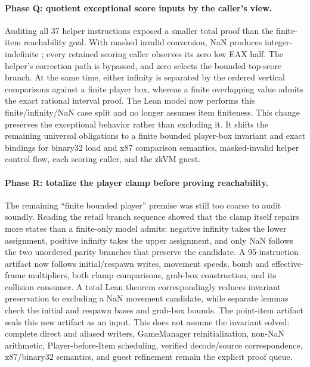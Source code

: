 \paragraph{Phase Q: quotient exceptional score inputs by the caller's view.}
Auditing all 37 helper instructions exposed a smaller total proof than the
finite-item reachability goal.  With masked invalid conversion, NaN produces
integer-indefinite ; every retained scoring caller
observes its zero low EAX half.  The helper's correction path is bypassed, and
zero selects the bounded top-score branch.  At the same time, either infinity
is separated by the ordered vertical comparisons against a finite player box,
whereas a finite overlapping value admits the exact rational interval proof.
The Lean model now performs this finite/infinity/NaN case split and no longer
assumes item finiteness.  This change preserves the exceptional behavior
rather than excluding it.  It shifts the remaining universal obligations to a
finite bounded player-box invariant and exact bindings for binary32 load and
x87 comparison semantics, masked-invalid helper control flow, each scoring
caller, and the zkVM guest.

\paragraph{Phase R: totalize the player clamp before proving reachability.}
The remaining ``finite bounded player'' premise was still too coarse to audit
soundly.  Reading the retail branch sequence showed that the clamp itself
repairs more states than a finite-only model admits: negative infinity takes
the lower assignment, positive infinity takes the upper assignment, and only
NaN follows the two unordered parity branches that preserve the candidate.
A 95-instruction artifact now follows initial/respawn writes, movement speeds,
bomb and effective-frame multipliers, both clamp comparisons, grab-box
construction, and its collision consumer.  A total Lean theorem correspondingly
reduces invariant preservation to excluding a NaN movement candidate, while
separate lemmas check the initial and respawn bases and grab-box bounds.  The
point-item artifact seals this new artifact as an input.  This does not assume
the invariant solved: complete direct and aliased writers, GameManager
reinitialization, non-NaN arithmetic, Player-before-Item scheduling, verified
decode/source correspondence, x87/binary32 semantics, and guest refinement
remain the explicit proof queue.

